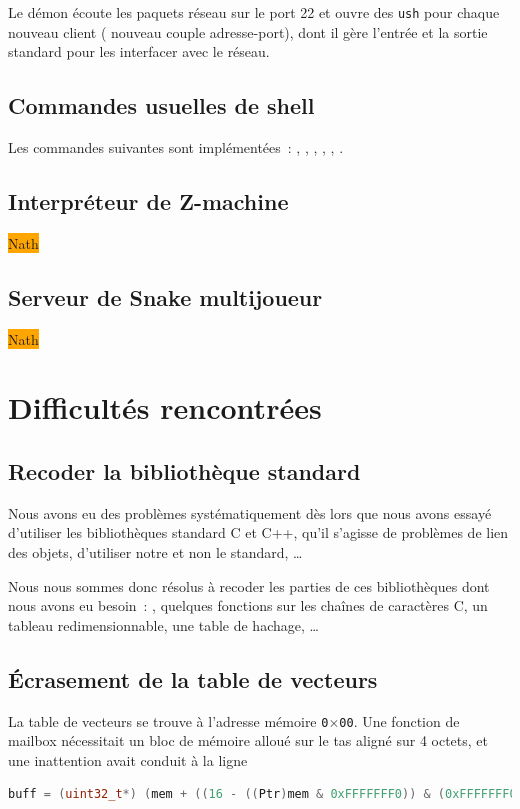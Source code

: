 \documentclass[11pt,a4paper]{article}
\newcommand{\hex}[1]{\texttt{0$\times$#1}}
\newcommand{\fname}[1]{\texttt{#1}} %
\newcommand{\todo}[1]{\colorbox{orange}{\color{blue}{\Large TODO:} #1}}
\begin{document}
Le démon écoute les paquets réseau sur le port 22 et ouvre des \fname{ush}
pour chaque nouveau client (\ie{} nouveau couple adresse-port), dont il gère
l'entrée et la sortie standard pour les interfacer avec le réseau.

\subsection{Commandes usuelles de shell}
Les commandes suivantes sont implémentées~:
, , , , , .

\subsection{Interpréteur de Z-machine}
\todo{Nath}

\subsection{Serveur de Snake multijoueur}
\todo{Nath}

\section{Difficultés rencontrées}


\subsection*{Recoder la bibliothèque standard}
Nous avons eu des problèmes systématiquement dès lors que nous avons essayé
d'utiliser les bibliothèques standard C et C++, qu'il s'agisse de problèmes de
lien des objets, d'utiliser notre  et non le 
standard, \ldots

Nous nous sommes donc résolus à recoder les parties de ces bibliothèques dont
nous avons eu besoin~: , quelques fonctions sur les chaînes de
caractères C, un tableau redimensionnable, une table de hachage, \ldots

\subsection*{Écrasement de la table de vecteurs}
La table de vecteurs se trouve à l'adresse mémoire \hex{00}. Une fonction de
mailbox nécessitait un bloc de mémoire alloué sur le tas aligné sur 4 octets,
et une inattention avait conduit à la ligne
\begin{lstlisting}[language=C++]
buff = (uint32_t*) (mem + ((16 - ((Ptr)mem & 0xFFFFFFF0)) & (0xFFFFFFF0)));
\end{lstlisting}
\end{document}
